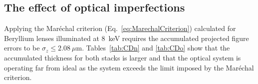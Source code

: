 \begin{refsection}
\subsection{The effect of optical imperfections}\label{section:discussion_imperfections}

Applying the Mar\'echal criterion (Eq.~\ref{eq:MarechalCriterion}) calculated for Beryllium lenses illuminated at 8~keV requires the accumulated projected figure errors to be $\sigma_z\leq2.08~\mu\text{m}$. Tables~\ref{tab:CDn} and \ref{tab:CDo} show that the accumulated thickness for both stacks is larger and that the optical system is operating far from ideal as the system exceeds the limit imposed by the Mar\'echal criterion.



\end{refsection}
